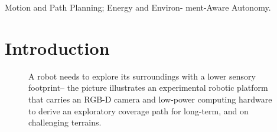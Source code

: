 \documentclass[lettersize,journal,twoside]{IEEEtran}
\theoremstyle{definition}
\begin{document}
\begin{IEEEkeywords}
Motion and Path Planning; Energy and Environ- ment-Aware Autonomy.
\end{IEEEkeywords}



\section{Introduction}
\begin{figure}
       
  \caption{
    A robot needs to explore its surroundings with a lower sensory footprint--%
    the picture illustrates an experimental robotic platform that carries an RGB-D camera and low-power computing hardware to derive an exploratory coverage path for %
    long-term, and %
    on challenging terrains. %
  }
  \label{fig:0}
\end{figure}
\end{document}
